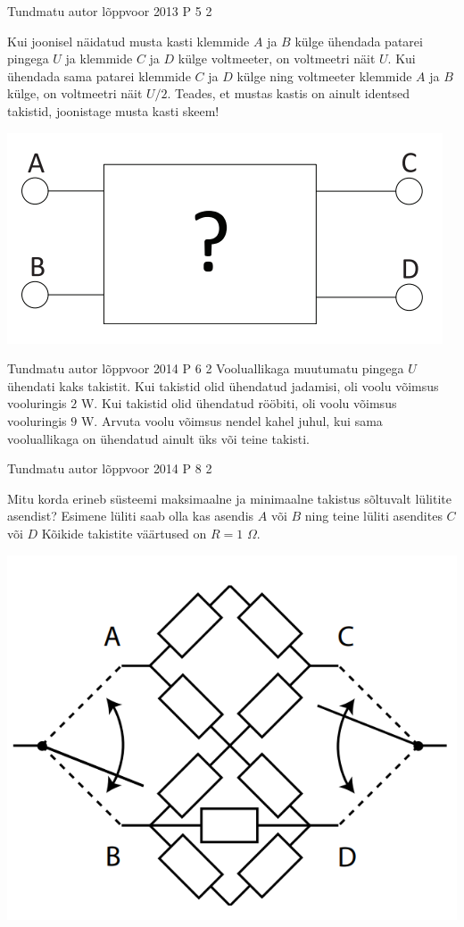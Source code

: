 \documentclass[11pt]{article}
\begin{document}
{%
{Tundmatu autor} %
{lõppvoor} %
{2013} %
{P 5} %
{2} %
{
\ifStatement
Kui joonisel näidatud musta kasti klemmide $A$ ja $B$ külge ühendada patarei pingega $U$ ja klemmide $C$ ja $D$ külge voltmeeter, on voltmeetri näit $U$. Kui ühendada sama patarei klemmide $C$ ja $D$ külge ning voltmeeter klemmide $A$ ja $B$ külge, on voltmeetri näit $U/2$. Teades, et mustas kastis on ainult identsed takistid, joonistage musta kasti skeem!
\begin{center}
	\includegraphics[width=0.5\linewidth]{2013-v3p-05-yl.png}
\end{center}
\fi
}

{Tundmatu autor} %
{lõppvoor} %
{2014} %
{P 6} %
{2} %
{
\ifStatement
Vooluallikaga muutumatu pingega $U$ ühendati kaks takistit. Kui takistid olid ühendatud jadamisi, oli voolu võimsus vooluringis $2$ W. Kui takistid olid ühendatud rööbiti, oli voolu võimsus vooluringis $9$ W. Arvuta voolu võimsus nendel kahel juhul, kui sama vooluallikaga on ühendatud ainult üks või teine takisti.
\fi
}

{Tundmatu autor} %
{lõppvoor} %
{2014} %
{P 8} %
{2} %
{
\ifStatement
Mitu korda erineb süsteemi maksimaalne ja minimaalne takistus sõltuvalt lülitite asendist? Esimene lüliti saab olla kas asendis $A$ või $B$ ning teine lüliti asendites $C$ või $D$ Kõikide takistite väärtused on $R = 1$ $\Omega$.
\begin{center}
	\includegraphics[width=0.5\linewidth]{2014-v3p-08-yl.png}
\end{center}
\fi
}


}
\end{document}
